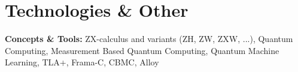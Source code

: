 \documentclass[10pt, letterpaper]{article}
\begin{document}




    



        
    

        

    \section{Technologies \& Other}

        \begin{onecolentry}
            \textbf{Concepts \& Tools:} ZX-calculus and variants (ZH, ZW, ZXW, ...), Quantum Computing, Measurement Based Quantum Computing, Quantum Machine Learning, TLA+, Frama-C, CBMC, Alloy
        \end{onecolentry}
\end{document}
